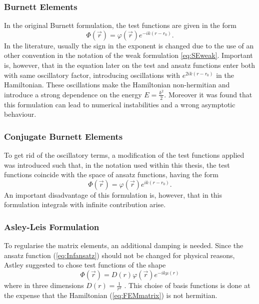 \subsubsection{Burnett Elements}
In the original Burnett formulation, the test functions are given in the form
\begin{equation} \label{eq:BUelem}
 \Phi(\vec{r}) = \varphi(\vec{r}) e^{-ik(r-r_0)}.
\end{equation}
In the literature, usually the sign in the exponent is changed due to the use of an other convention in the notation of the weak formulation \ref{eq:SEweak}.
Important is, however, that in the equation later on the test and ansatz functions enter both with same oscillatory factor, introducing oscillations with $e^{2ik(r-r_0)}$ in the Hamiltonian.
These oscillations make the Hamiltonian non-hermitian and introduce a strong dependence on the energy $E=\frac{k^2}{2}$.
Moreover it was found that this formulation can lead to numerical instabilities \cite{Astley} and a wrong asymptotic behaviour.

\subsubsection{Conjugate Burnett Elements}
To get rid of the oscillatory terms, a modification of the test functions applied was introduced such that, in the notation used within this thesis, the test functions coincide with the space of ansatz functions, having the form
\begin{equation}
 \Phi(\vec{r}) = \varphi(\vec{r}) e^{ik(r-r_0)}.
\end{equation}
An important disadvantage of this formulation is, however, that in this formulation integrals with infinite contribution arise.

\subsubsection{Asley-Leis Formulation}
To regularise the matrix elements, an additional damping is needed.
Since the ansatz function (\ref{eq:Infansatz}) should not be changed for physical reasons, Astley suggested to chose test functions of the shape
\begin{equation} \label{eq:ALelem}
 \Phi(\vec{r}) = D(r)\varphi(\vec{r}) e^{-ik\mu(r)}
\end{equation}
where in three dimensions $D(r)=\frac{1}{r^2}$ \cite{astley2}.
This choise of basis functions is done at the expense that the Hamiltonian (\ref{eq:FEMmatrix}) is not hermitian.

